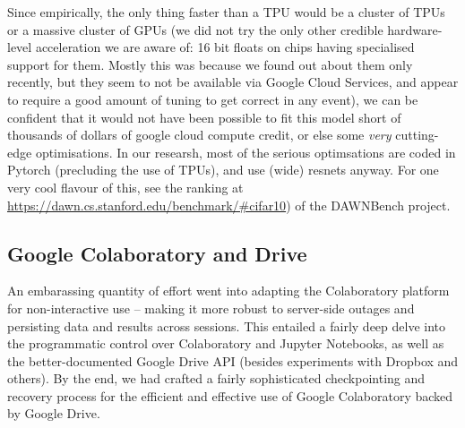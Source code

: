 \documentclass[10pt,twocolumn,letterpaper]{article}
\begin{document}
    Since empirically, the only thing faster than a TPU would be a cluster of TPUs or a massive cluster of GPUs (we did not try the only other credible hardware-level acceleration we are aware of: 16 bit floats on chips having specialised support for them. Mostly this was because we found out about them only recently, but they seem to not be available via Google Cloud Services, and appear to require a good amount of tuning to get correct in any event), we can be confident that it would not have been possible to fit this model short of thousands of dollars of google cloud compute credit, or else some \emph{very} cutting-edge optimisations. In our researsh, most of the serious optimsations are coded in Pytorch (precluding the use of TPUs), and use (wide) resnets anyway. For one very cool flavour of this, see the ranking at \url{https://dawn.cs.stanford.edu/benchmark/#cifar10}) of the \cite{Coleman2017} DAWNBench project.



  \subsection{Google Colaboratory and Drive}
    An embarassing quantity of effort went into adapting the Colaboratory platform for non-interactive use -- making it more robust to server-side outages and persisting data and results across sessions. This entailed a fairly deep delve into the programmatic control over Colaboratory and Jupyter Notebooks, as well as the better-documented Google Drive API (besides experiments with Dropbox and others). By the end, we had crafted a fairly sophisticated checkpointing and recovery process for the efficient and effective use of Google Colaboratory backed by Google Drive.
\end{document}
